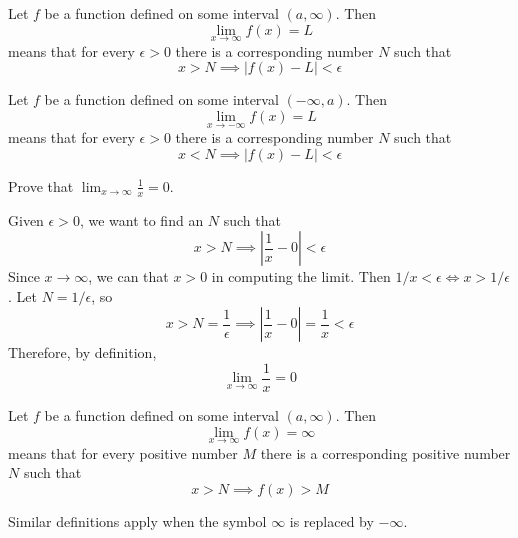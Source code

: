 \begin{definition}
    Let \(f\) be a function defined on some interval \((a,\infty)\).
    Then
    \[\lim_{x\to\infty}f(x)=L\]
    means that for every \(\epsilon>0\) there is a corresponding number \(N\)
    such that
    \[x>N\implies|f(x)-L|<\epsilon\]
\end{definition}
\begin{definition}
    Let \(f\) be a function defined on some interval \((-\infty,a)\).
    Then
    \[\lim_{x\to-\infty}f(x)=L\]
    means that for every \(\epsilon>0\) there is a corresponding number \(N\)
    such that
    \[x<N\implies|f(x)-L|<\epsilon\]
\end{definition}
\begin{problem}
    Prove that \(\displaystyle{\lim_{x\to \infty}\frac{1}{x}=0}\).
\end{problem}
\begin{solution}
    Given \(\epsilon>0\),
    we want to find an \(N\) such that
    \[x>N\implies\left|\frac{1}{x}-0\right|<\epsilon\]
    Since \(x\to \infty\),
    we can that \(x>0\) in computing the limit.
    Then \(1/x<\epsilon\iff x>1/\epsilon\).
    Let \(N=1/\epsilon\),
    so
    \[x>N=\frac{1}{\epsilon}\implies\left|\frac{1}{x}-0\right|=\frac{1}{x}
    <\epsilon\]
    Therefore,
    by definition,
    \[\lim_{x\to \infty}\frac{1}{x}=0\]
\end{solution}
\begin{definition}
    Let \(f\) be a function defined on some interval \((a,\infty)\).
    Then
    \[\lim_{x\to\infty}f(x)=\infty\]
    means that for every positive number \(M\) there is a corresponding
    positive number \(N\) such that
    \[x>N\implies f(x)>M\]
\end{definition}
Similar definitions apply when the symbol \(\infty\) is replaced by \(-\infty\).